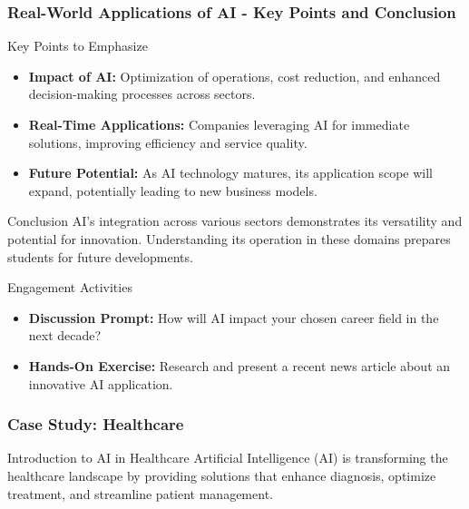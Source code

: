 \documentclass[aspectratio=169]{beamer}
\begin{document}
\begin{frame}[fragile]
    \frametitle{Real-World Applications of AI - Key Points and Conclusion}
    \begin{block}{Key Points to Emphasize}
        \begin{itemize}
            \item \textbf{Impact of AI:} Optimization of operations, cost reduction, and enhanced decision-making processes across sectors.
            \item \textbf{Real-Time Applications:} Companies leveraging AI for immediate solutions, improving efficiency and service quality.
            \item \textbf{Future Potential:} As AI technology matures, its application scope will expand, potentially leading to new business models.
        \end{itemize}
    \end{block}
    
    \begin{block}{Conclusion}
        AI's integration across various sectors demonstrates its versatility and potential for innovation. Understanding its operation in these domains prepares students for future developments.
    \end{block}
    
    \begin{block}{Engagement Activities}
        \begin{itemize}
            \item \textbf{Discussion Prompt:} How will AI impact your chosen career field in the next decade?
            \item \textbf{Hands-On Exercise:} Research and present a recent news article about an innovative AI application.
        \end{itemize}
    \end{block}
\end{frame}

\begin{frame}[fragile]
    \frametitle{Case Study: Healthcare}
    \begin{block}{Introduction to AI in Healthcare}
        Artificial Intelligence (AI) is transforming the healthcare landscape by providing solutions that enhance diagnosis, optimize treatment, and streamline patient management.
    \end{block}
\end{frame}
\end{document}
